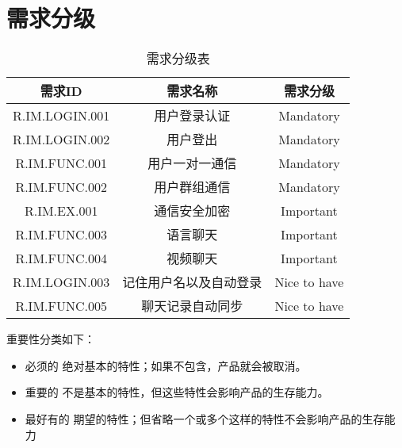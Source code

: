 \chapter{需求分级}
\begin{table}[htbp]
\centering
\caption{需求分级表} \label{tab:classification}
\begin{tabular}{|c|c|c|}
    \hline
    需求ID & 需求名称 & 需求分级 \\
    \hline
    R.IM.LOGIN.001  & 用户登录认证 & Mandatory \\
    \hline
    R.IM.LOGIN.002 & 用户登出 & Mandatory \\
    \hline
    R.IM.FUNC.001 & 用户一对一通信 & Mandatory \\
    \hline
    R.IM.FUNC.002 & 用户群组通信 & Mandatory \\
    \hline
    R.IM.EX.001 & 通信安全加密 & Important \\
    \hline
    R.IM.FUNC.003 & 语言聊天 & Important \\
    \hline
    R.IM.FUNC.004 & 视频聊天 & Important \\
    \hline
    R.IM.LOGIN.003 & 记住用户名以及自动登录 & Nice to have \\
    \hline
    R.IM.FUNC.005 & 聊天记录自动同步 & Nice to have \\
    \hline

\end{tabular}
\end{table}


重要性分类如下：
\begin{itemize}
\item 必须的		绝对基本的特性；如果不包含，产品就会被取消。
\item 重要的		不是基本的特性，但这些特性会影响产品的生存能力。
\item 最好有的		期望的特性；但省略一个或多个这样的特性不会影响产品的生存能力
\end{itemize}
